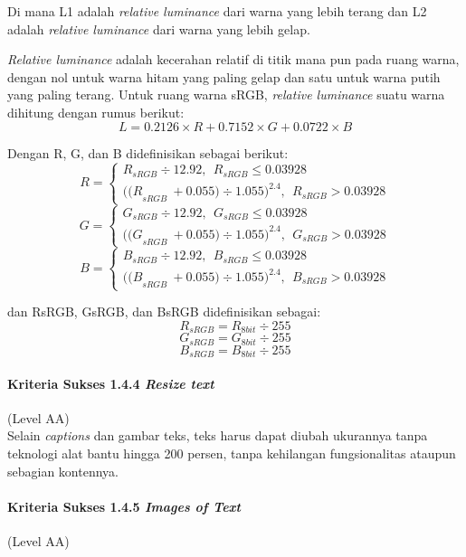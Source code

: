 Di mana L1 adalah \textit{relative luminance} dari warna yang lebih terang dan L2 adalah \textit{relative luminance} dari warna yang lebih gelap.

\textit{Relative luminance} adalah kecerahan relatif di titik mana pun pada ruang warna, dengan nol untuk warna hitam yang paling gelap dan satu untuk warna putih yang paling terang. Untuk ruang warna sRGB, \textit{relative luminance} suatu warna dihitung dengan rumus berikut:
\[
	L = 0.2126 \times R + 0.7152 \times G + 0.0722 \times B
\]

Dengan R, G, dan B didefinisikan sebagai berikut:
\[
	R=\left\{
	\begin{array}{rr}
	R_{sRGB}\div 12.92,\ \ R_{sRGB}\le 0.03928 \\ 
	{{((R}_{sRGB}\ +0.055)\div 1.055)}^{2.4},\ \ R_{sRGB}>0.03928
	\end{array}
	\right.
\]
\[
	G=\left\{
	\begin{array}{rr}
	G_{sRGB}\div 12.92,\ \ G_{sRGB}\le 0.03928 \\ 
	{{((G}_{sRGB}\ +0.055)\div 1.055)}^{2.4},\ \ G_{sRGB}>0.03928
	\end{array}
	\right.
\]
\[
	B=\left\{
	\begin{array}{rr}
	B_{sRGB}\div 12.92,\ \ B_{sRGB}\le 0.03928 \\ 
	{{((B}_{sRGB}\ +0.055)\div 1.055)}^{2.4},\ \ B_{sRGB}>0.03928
	\end{array}
	\right.
\]

dan RsRGB, GsRGB, dan BsRGB didefinisikan sebagai:
\[
	R_{sRGB} = R_{8bit}\div 255
\]
\[
	G_{sRGB} = G_{8bit}\div 255
\]
\[
	B_{sRGB} = B_{8bit}\div 255
\] 

\paragraph{Kriteria Sukses 1.4.4 \textit{Resize text}}
\label{sec:kriteria_sukses_1.4.4}
(Level AA)\\

Selain \textit{captions} dan gambar teks, teks harus dapat diubah ukurannya tanpa teknologi alat bantu hingga 200 persen, tanpa kehilangan fungsionalitas ataupun sebagian kontennya.

\paragraph{Kriteria Sukses 1.4.5 \textit{Images of Text}}
\label{sec:kriteria_sukses_1.4.5}
(Level AA)\\

